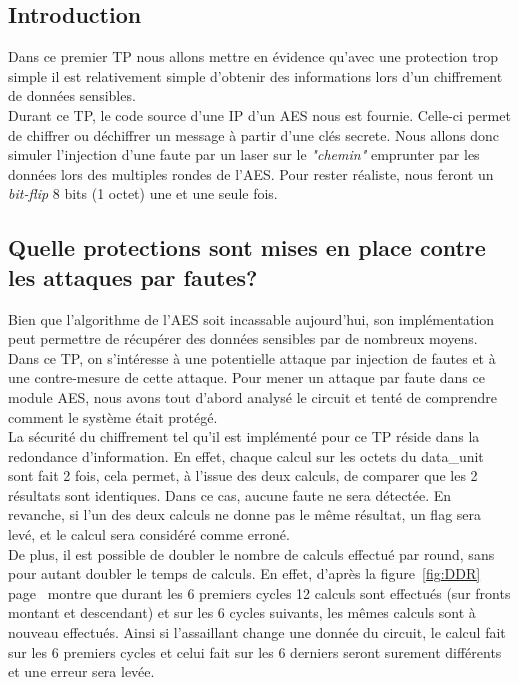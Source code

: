 \subsection{Introduction}
Dans ce premier TP nous allons mettre en évidence qu'avec une protection trop simple 
il est relativement simple d'obtenir des informations lors d'un chiffrement de données 
sensibles.\\

Durant ce TP, le code source d'une IP d'un AES nous est fournie. 
Celle-ci permet de chiffrer ou déchiffrer un message à partir d'une clés secrete. 
Nous allons donc simuler l'injection d'une faute par un laser sur le {\em "chemin"} 
emprunter par les données lors des multiples rondes de l'AES.
Pour rester réaliste, nous feront un {\em bit-flip} 8 bits (1 octet) une et une seule fois.

\subsection{Quelle protections sont mises en place contre les attaques par fautes?}

Bien que l'algorithme de l'AES soit incassable aujourd'hui, son implémentation
peut permettre de récupérer des données sensibles par de nombreux moyens.
Dans ce TP, on s'intéresse à une potentielle attaque par injection de fautes et
à une contre-mesure de cette attaque.
Pour mener un attaque par faute  dans ce module AES, nous avons tout d'abord
analysé le circuit et tenté de comprendre comment le système était protégé.\\

La sécurité du chiffrement tel qu'il est implémenté pour ce TP réside dans la
redondance d'information.
En effet, chaque calcul sur les octets du data\_unit sont fait 2 fois, cela
permet, à l'issue des deux calculs, de comparer que les 2 résultats sont
identiques.
Dans ce cas, aucune faute ne sera détectée. En revanche, si l'un des deux
calculs ne donne pas le même résultat, un flag sera levé, et le calcul sera
considéré comme erroné.\\

De plus, il est possible de doubler le nombre de calculs effectué par round,
sans pour autant doubler le temps de calculs.
En effet, d'après la figure~\ref{fig:DDR} page~\pageref{fig:DDR} montre que
durant les 6 premiers cycles 12 calculs sont effectués (sur fronts montant et
descendant)
et sur les 6 cycles suivants, les mêmes calculs sont à nouveau effectués.
Ainsi si l'assaillant change une donnée du circuit, le calcul fait sur les 6
premiers cycles et celui fait sur les 6 derniers seront surement différents et
une erreur sera levée.

